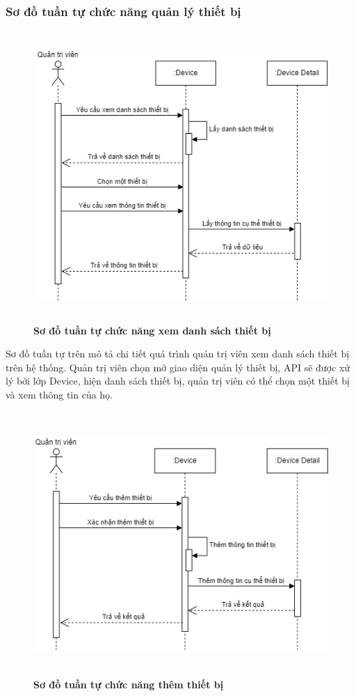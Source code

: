 \subsubsection{Sơ đồ tuần tự chức năng quản lý thiết bị}
\begin{figure}[H]
  \centering
  \includegraphics[width=13cm,height=11cm]{Images/sequence/sequence_manage_device.png}
  \caption[Sơ đồ tuần tự chức năng xem danh sách thiết bị]{\bfseries \fontsize{12pt}{0pt}
  \selectfont Sơ đồ tuần tự chức năng xem danh sách thiết bị}
  \label{sequence_manage_device} %
\end{figure}
Sơ đồ tuần tự trên mô tả chi tiết quá trình quản trị viên xem danh sách thiết bị trên hệ thống. Quản trị viên chọn mở giao diện quản lý thiết bị, 
API sẽ được xử lý bởi lớp Device, hiện danh sách thiết bị, quản trị viên có thể chọn một thiết bị và xem thông tin của họ. 
\begin{figure}[H]
  \centering
  \includegraphics[width=13cm,height=10cm]{Images/sequence/sequence_manage_add_device.png}
  \caption[Sơ đồ tuần tự chức năng thêm thiết bị]{\bfseries \fontsize{12pt}{0pt}
  \selectfont Sơ đồ tuần tự chức năng thêm thiết bị}
  \label{sequence_manage_add_device} %
\end{figure}
